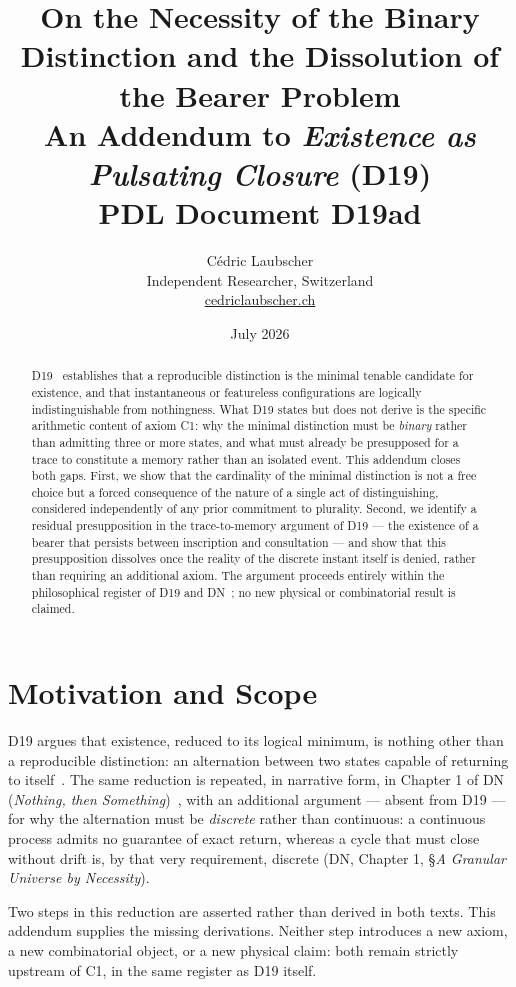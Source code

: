 \documentclass[11pt,a4paper]{article}
\title{\textbf{On the Necessity of the Binary Distinction and the Dissolution of the Bearer Problem}\texorpdfstring{\\[4pt]\large An Addendum to \emph{Existence as Pulsating Closure} (D19)}{: An Addendum to Existence as Pulsating Closure (D19)}\\[6pt]
{\large PDL Document D19ad}}
\author{C\'edric Laubscher\\[4pt]
\small Independent Researcher, Switzerland\\
\small \href{https://cedriclaubscher.ch}{cedriclaubscher.ch}}
\date{July 2026}
\begin{document}
\maketitle

\begin{abstract}
D19~\citep{D19} establishes that a reproducible distinction is the minimal tenable candidate for existence, and that instantaneous or featureless configurations are logically indistinguishable from nothingness. What D19 states but does not derive is the specific arithmetic content of axiom C1: why the minimal distinction must be \emph{binary} rather than admitting three or more states, and what must already be presupposed for a trace to constitute a memory rather than an isolated event. This addendum closes both gaps. First, we show that the cardinality of the minimal distinction is not a free choice but a forced consequence of the nature of a single act of distinguishing, considered independently of any prior commitment to plurality. Second, we identify a residual presupposition in the trace-to-memory argument of D19 --- the existence of a bearer that persists between inscription and consultation --- and show that this presupposition dissolves once the reality of the discrete instant itself is denied, rather than requiring an additional axiom. The argument proceeds entirely within the philosophical register of D19 and DN~\citep{DN}; no new physical or combinatorial result is claimed.
\end{abstract}

\clearpage

\section{Motivation and Scope}
\label{sec:motivation}

D19 argues that existence, reduced to its logical minimum, is nothing other than a reproducible distinction: an alternation between two states capable of returning to itself~\citep[\S 2--3]{D19}. The same reduction is repeated, in narrative form, in Chapter 1 of DN (\emph{Nothing, then Something})~\citep{DN}, with an additional argument --- absent from D19 --- for why the alternation must be \emph{discrete} rather than continuous: a continuous process admits no guarantee of exact return, whereas a cycle that must close without drift is, by that very requirement, discrete (DN, Chapter 1, \S \emph{A Granular Universe by Necessity}).

Two steps in this reduction are asserted rather than derived in both texts. This addendum supplies the missing derivations. Neither step introduces a new axiom, a new combinatorial object, or a new physical claim: both remain strictly upstream of C1, in the same register as D19 itself.
\end{document}
